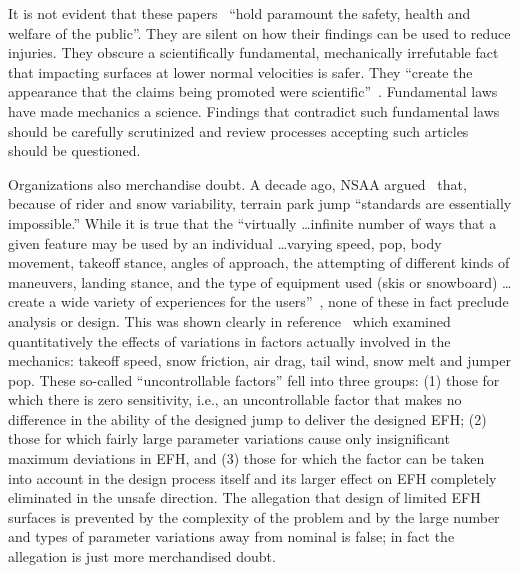 \documentclass[smallextended]{svjour3}       %
\begin{document}
It is not evident that these papers~\cite{Shealy2010,Shealy2015,Scher2015}
``hold paramount the safety, health and welfare of the public''. They are
silent on how their findings can be used to reduce injuries. They obscure a
scientifically fundamental, mechanically irrefutable fact that impacting
surfaces at lower normal velocities is safer. They ``create the appearance that
the claims being promoted were scientific''~\cite[page 244]{Oreskes2010}.
Fundamental laws have made mechanics a science. Findings that contradict such
fundamental laws should be carefully scrutinized and review processes accepting
such articles should be questioned.

Organizations also merchandise doubt. A decade ago, NSAA argued~\cite{NSAA2008}
that, because of rider and snow variability, terrain park jump ``standards are
essentially impossible.'' While it is true that the ``virtually \ldots infinite
number of ways that a given feature may be used by an individual \ldots varying
speed, pop, body movement, takeoff stance, angles of approach, the attempting
of different kinds of maneuvers, landing stance, and the type of equipment used
(skis or snowboard) \ldots create a wide variety of experiences for the
users''~\cite{NSAA2008}, none of these in fact preclude analysis or design.
This was shown clearly in reference~\cite{Hubbard2012} which examined
quantitatively the effects of variations in factors actually involved in the
mechanics: takeoff speed, snow friction, air drag, tail wind, snow melt and
jumper pop. These so-called ``uncontrollable factors'' fell into three groups:
(1) those for which there is zero sensitivity, i.e., an uncontrollable factor
that makes no difference in the ability of the designed jump to deliver the
designed EFH; (2) those for which fairly large parameter variations cause only
insignificant maximum deviations in EFH, and (3) those for which the factor can
be taken into account in the design process itself and its larger effect on EFH
completely eliminated in the unsafe direction. The allegation that design of
limited EFH surfaces is prevented by the complexity of the problem and by the
large number and types of parameter variations away from nominal is false; in
fact the allegation is just more merchandised doubt.

\end{document}
